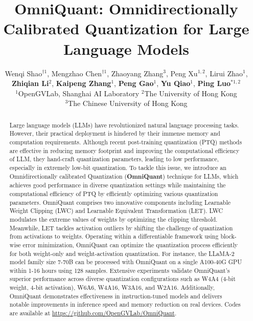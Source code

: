 \documentclass{article} %
\title{OmniQuant: Omnidirectionally Calibrated Quantization for Large Language Models }
\author{Wenqi Shao$^{\dagger1}$, Mengzhao Chen$^{\dagger1}$, Zhaoyang Zhang$^3$, Peng Xu$^{1,2}$, Lirui Zhao$^{1}$, \\
\textbf{Zhiqian Li}$^2$, \textbf{Kaipeng Zhang}$^1$, \textbf{Peng Gao}$^1$, \textbf{Yu Qiao}$^1$, \textbf{Ping Luo}$^{*1,2}$ \\
$^1$OpenGVLab, Shanghai AI Laboratory  $^2$The University of Hong Kong\\ $^3$The Chinese University of Hong Kong }
\begin{document}
\renewcommand{\thefootnote}{\fnsymbol{footnote}}
{\let\thefootnote\relax{}}

\maketitle

\begin{abstract}
Large language models (LLMs) have revolutionized natural language processing tasks. However, their practical deployment is hindered by their immense memory and computation requirements.
Although recent post-training quantization (PTQ) methods are effective in reducing memory footprint and improving the computational efficiency of LLM, they hand-craft quantization parameters, leading to low performance, especially in extremely low-bit quantization.
%
To tackle this issue, we introduce an Omnidirectionally calibrated Quantization (\textbf{OmniQuant}) technique for LLMs, which achieves good performance in diverse quantization settings while maintaining the computational efficiency of PTQ by efficiently optimizing various quantization parameters.
%
OmniQuant comprises two innovative components including Learnable Weight Clipping (LWC) and Learnable Equivalent Transformation (LET). LWC modulates the extreme values of weights by optimizing the clipping threshold. Meanwhile, LET tackles activation outliers by shifting the challenge of quantization from activations to weights.
%
Operating within a differentiable framework using block-wise error minimization, OmniQuant can optimize the quantization process efficiently for both weight-only and weight-activation quantization.
%
For instance, the LLaMA-2 model family size 7-70B can be processed with OmniQuant on a single A100-40G GPU within 1-16 hours using 128 samples.
%
Extensive experiments validate OmniQuant's superior performance across diverse quantization configurations such as W4A4 (4-bit weight, 4-bit activation), W6A6, W4A16, W3A16, and W2A16. Additionally, OmniQuant demonstrates effectiveness in instruction-tuned models and delivers notable improvements in inference speed and memory reduction on real devices.
%
Codes are available at 
\url{https://github.com/OpenGVLab/OmniQuant}.

%





\end{abstract}
\end{document}
